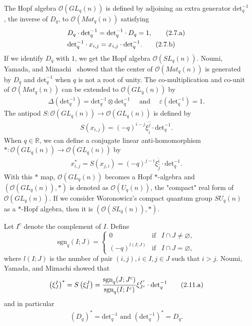 \documentclass[table,a4paper,reqno]{amsart}
\numberwithin{equation}{section}
\theoremstyle{definition}
\begin{document}
The Hopf algebra $\mathcal{O}(GL_q(n))$ is defined by adjoining an extra generator $\text{det}_q^{-1}$, the inverse of $D_q$, to $\mathcal{O}(Mat_q(n))$ satisfying
\begin{align}\stepcounter{equation}
    &D_q\cdot \text{det}_q^{-1}=\text{det}_q^{-1}\cdot D_q=1,\tag{2.7.a}\label{eq:2.7.a}\\
    & \text{det}_q^{-1}\cdot x_{i,j}=x_{i,j}\cdot \text{det}_q^{-1}.\tag{2.7.b}\label{eq:2.7.b}
\end{align}
If we identify $D_q$ with $1$, we get the Hopf algebra $\mathcal{O}(SL_q(n))$. Noumi, Yamada, and Mimachi~\cite{noumi1993finite} showed that the center of $\mathcal{O}(Mat_q(n))$ is generated by $D_q$ and $\text{det}_q^{-1}$ when $q$ is not a root of unity. The co-multiplication and co-unit of $\mathcal{O}(Mat_q(n))$ can be extended to $\mathcal{O}(GL_q(n))$ by
\begin{align}
    \Delta(\text{det}_q^{-1})=\text{det}_q^{-1}\otimes\text{det}_q^{-1}\quad \text{ and }\quad\varepsilon(\text{det}_q^{-1})=1.\label{eq:2.8}
\end{align}
The antipod $S:\mathcal{O}(GL_q(n))\rightarrow \mathcal{O}(GL_q(n))$ is defined by
\begin{align}
    S(x_{i,j})=(-q)^{i-j}\xi_{\widehat{i}}^{\widehat{j}}\cdot \text{det}_q^{-1}.\label{eq:2.9}
\end{align}
When $q\in\mathbb{R}$, we can define a conjugate linear anti-homomorphism $*:\mathcal{O}(GL_q(n))\rightarrow \mathcal{O}(GL_q(n))$ by
\begin{align}
    x_{i,j}^*=S(x_{j,i})=(-q)^{j-i}\xi_{\widehat{j}}^{\widehat{i}}\cdot \text{det}_q^{-1}.\label{eq:2.10}
\end{align}
With this $*$ map, $\mathcal{O}(GL_q(n))$ becomes a Hopf $*$-algebra and $(\mathcal{O}(GL_q(n)),*)$ is denoted as $\mathcal{O}(U_q(n))$, the "compact" real form of $\mathcal{O}(GL_q(n))$. If we consider Woronowicz's compact quantum group $SU_q(n)$ as a $*$-Hopf algebra, then it is $(\mathcal{O}(SL_q(n)),*)$.

Let $I^c$ denote the complement of $I$. Define
\begin{equation*}
    \text{sgn}_q(I;J)=\left\{\begin{array}{lcr}
        0 & \text{if} & I\cap J\neq\varnothing, \\
        (-q)^{l(I;J)} & \text{if} & I\cap J=\varnothing,
    \end{array}\right.
\end{equation*}
where $l(I;J)$ is the number of pair $(i,j), i\in I, j\in J$ such that $i>j$. Noumi, Yamada, and Mimachi showed that
\begin{align}\stepcounter{equation}
    \left(\xi_J^I\right)^*=S\left(\xi_I^J\right)=\frac{\text{sgn}_q(J;J^c)}{\text{sgn}_q(I;I^c)}\xi_{J^c}^{I^c}\cdot \text{det}_q^{-1}\tag{2.11.a}\label{eq:2.11.a}
\end{align}
and in particular
\begin{align}
    \left(D_q\right)^*=\text{det}_{q}^{-1}\text{ and }\left(\text{det}_{q}^{-1}\right)^*=D_q.\tag{2.11.b}\label{eq:2.11.b}
\end{align}
\end{document}
